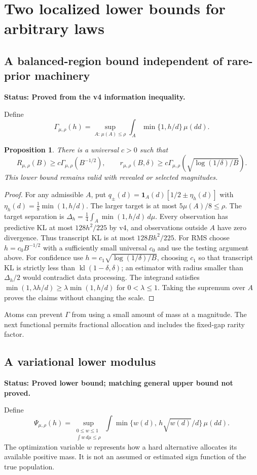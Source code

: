 \documentclass[11pt]{article}
\newtheorem{proposition}[theorem]{Proposition}
\theoremstyle{definition}\newtheorem{conjecture}[theorem]{Conjecture}
\theoremstyle{remark}\newtheorem{remark}[theorem]{Remark}
\newcommand{\ind}{\mathbf1}\newcommand{\kl}{\operatorname{kl}}\newcommand{\KL}{\operatorname{KL}}
\newcommand{\status}[1]{\par\smallskip\noindent\textbf{Status: #1.}\par}
\begin{document}
\section{Two localized lower bounds for arbitrary laws}
\subsection{A balanced-region bound independent of rare-prior machinery}
\status{Proved from the v4 information inequality}
Define
\begin{equation}\label{eq:Gamma}
 \Gamma_{\mu,\rho}(h)=
 \sup_{A:\,\mu(A)\le\rho}\int_A\min\{1,h/d\}\,\mu(dd).
\end{equation}
\begin{proposition}\label{prop:Gamma}
There is a universal $c>0$ such that
\[
 R_{\mu,\rho}(B)\ge c\Gamma_{\mu,\rho}(B^{-1/2}),\qquad
 r_{\mu,\rho}(B,\delta)\ge c\Gamma_{\mu,\rho}\left(\sqrt{\log(1/\delta)/B}\right).
\]
This lower bound remains valid with revealed or selected magnitudes.
\end{proposition}
\begin{proof}
For any admissible $A$, put
$q_\pm(d)=\ind_A(d)[1/2\pm\eta_h(d)]$ with
$\eta_h(d)=\frac18\min(1,h/d)$. The larger target is at most $5\mu(A)/8\le\rho$. The target separation is
$\Delta_h=\frac14\int_A\min(1,h/d)\,d\mu$.
Every observation has predictive KL at most $128h^2/225$ by v4, and observations outside $A$ have zero divergence. Thus transcript KL is at most $128Bh^2/225$.
For RMS choose $h=c_0B^{-1/2}$ with a sufficiently small universal $c_0$ and use the testing argument above. For confidence use $h=c_1\sqrt{\log(1/\delta)/B}$, choosing $c_1$ so that transcript KL is strictly less than $\kl(1-\delta,\delta)$; an estimator with radius smaller than $\Delta_h/2$ would contradict data processing. The integrand satisfies $\min(1,\lambda h/d)\ge\lambda\min(1,h/d)$ for $0<\lambda\le1$. Taking the supremum over $A$ proves the claims without changing the scale.
\end{proof}

Atoms can prevent $\Gamma$ from using a small amount of mass at a magnitude. The next functional permits fractional allocation and includes the fixed-gap rarity factor.

\subsection{A variational lower modulus}
\status{Proved lower bound; matching general upper bound not proved}
Define
\begin{equation}\label{eq:Psi}
 \Psi_{\mu,\rho}(h)=
 \sup_{\substack{0\le w\le1\\\int w\,d\mu\le\rho}}
 \int\min\{w(d),\,h\sqrt{w(d)}/d\}\,\mu(dd).
\end{equation}
The optimization variable $w$ represents how a hard alternative allocates its available positive mass. It is not an assumed or estimated sign function of the true population.
\end{document}
